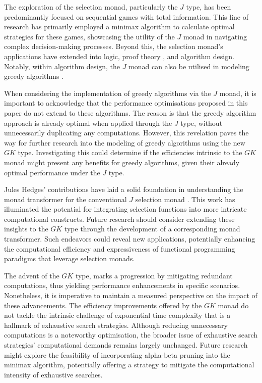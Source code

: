\documentclass[runningheads]{llncs}
\begin{document}
The exploration of the selection monad, particularly the \(J\) type, has
been predominantly focused on sequential games with total
information\cite{escardo2010sequential}. This line of research has
primarily employed a minimax algorithm to calculate optimal strategies
for these games, showcasing the utility of the \(J\) monad in navigating
complex decision-making processes. Beyond this, the selection monad's
applications have extended into logic, proof theory
\cite{escardo2010sequential}, and algorithm design. Notably, within
algorithm design, the \(J\) monad can also be utilised in modeling
greedy algorithms \cite{hartmann2022algorithm}.

When considering the implementation of greedy algorithms via the \(J\)
monad, it is important to acknowledge that the performance optimisations
proposed in this paper do not extend to these algorithms. The reason is
that the greedy algorithm approach is already optimal when applied
through the \(J\) type, without unnecessarily duplicating any
computations. However, this revelation paves the way for further
research into the modeling of greedy algorithms using the new \(GK\)
type. Investigating this could determine if the efficiencies intrinsic
to the \(GK\) monad might present any benefits for greedy algorithms,
given their already optimal performance under the \(J\) type.

Jules Hedges' contributions have laid a solid foundation in
understanding the monad transformer for the conventional \(J\) selection
monad \cite{hedges2014monad}. This work has illuminated the potential
for integrating selection functions into more intricate computational
constructs. Future research should consider extending these insights to
the \(GK\) type through the development of a corresponding monad
transformer. Such endeavors could reveal new applications, potentially
enhancing the computational efficiency and expressiveness of functional
programming paradigms that leverage selection monads.

The advent of the \(GK\) type, marks a progression by mitigating
redundant computations, thus yielding performance enhancements in
specific scenarios. Nonetheless, it is imperative to maintain a measured
perspective on the impact of these advancements. The efficiency
improvements offered by the \(GK\) monad do not tackle the intrinsic
challenge of exponential time complexity that is a hallmark of
exhaustive search strategies. Although reducing unnecessary computations
is a noteworthy optimisation, the broader issue of exhaustive search
strategies' computational demands remains largely unchanged. Future
research might explore the feasibility of incorporating alpha-beta
pruning into the minimax algorithm, potentially offering a strategy to
mitigate the computational intensity of exhaustive searches.
\end{document}
